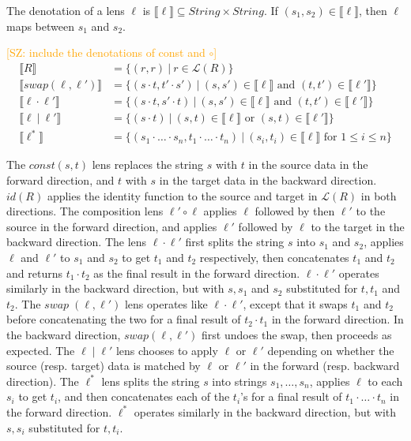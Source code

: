 \documentclass{svproc}
\newcommand{\FINISH}[3]{\ifdraft\textcolor{#1}{[#2: #3]}\fi}
\newcommand{\saz}[1]{\FINISH{orange}{SZ}{#1}}
\newcommand{\sep}{\ensuremath{\ | \ }}
\begin{document}
The denotation of a lens $\ell$ is $\llbracket \ell \rrbracket \subseteq
\mathit{String} \times \mathit{String}$. If $(s_1, s_2) \in \llbracket \ell
\rrbracket$, then $\ell$ maps between $s_1$ and $s_2$.

\saz{include the denotations of const and $\circ$}
\begin{align*}
\llbracket R \rrbracket &= \{(r, r) \sep r \in \mathcal{L}(R)\}\\
\llbracket swap(\ell, \ell') \rrbracket &= \{(s \cdot t, t' \cdot s') \sep
(s, s') \in \llbracket \ell \rrbracket \text{ and } (t, t') \in \llbracket
\ell' \rrbracket\}\\
\llbracket \ell \cdot \ell' \rrbracket &= \{(s \cdot t, s' \cdot t) \sep
(s, s') \in \llbracket \ell \rrbracket \text{ and } (t, t') \in \llbracket
\ell' \rrbracket\}\\
\llbracket \ell \sep \ell' \rrbracket &= \{(s \cdot t) \sep
(s, t) \in \llbracket \ell \rrbracket \text{ or } (s, t) \in \llbracket
\ell' \rrbracket\}\\
\llbracket \ell^* \rrbracket &= \{(s_1 \cdot \ldots \cdot s_n, t_1 \cdot \ldots
\cdot t_n) \sep (s_i, t_i) \in \llbracket \ell \rrbracket \text{ for } 1
\leq i \leq n\}
\end{align*}

The $\mathit{const}(s, t)$ lens replaces the string $s$ with $t$ in the source
data in the forward direction, and $t$ with $s$ in the target data in the backward
direction. $\mathit{id}(R)$ applies the identity function to the source and target
in $\mathcal{L}(R)$ in both directions. The composition lens $\ell' \circ \ell$
applies $\ell$ followed by then $\ell'$ to the source in the forward direction,
and applies $\ell'$ followed by $\ell$ to the target in the backward direction.
The lens $\ell \cdot \ell'$ first splits the string $s$ into $s_1$ and $s_2$,
applies $\ell$ and $\ell'$ to $s_1$ and $s_2$ to get $t_1$ and $t_2$
respectively, then concatenates $t_1$ and $t_2$ and returns $t_1 \cdot t_2$ as
the final result in the forward direction. $\ell \cdot \ell'$ operates
similarly in the backward direction, but with $s, s_1$ and $s_2$ substituted
for $t, t_1$ and $t_2$. The $\mathit{swap} \; (\ell, \ell')$ lens operates
like $\ell \cdot \ell'$, except that it swaps $t_1$ and $t_2$ before
concatenating the two for a final result of $t_2 \cdot t_1$ in the forward
direction. In the backward direction, $\mathit{swap}(\ell, \ell')$ first undoes
the swap, then proceeds as expected. The $\ell \; | \; \ell'$ lens
chooses to apply $\ell$ or $\ell'$ depending on whether the source
(resp. target) data is matched by $\ell$ or $\ell'$ in the forward (resp.
backward direction). The $\ell^*$ lens splits the string $s$ into strings $s_1,
\ldots, s_n$, applies $\ell$ to each $s_i$ to get $t_i$, and then concatenates
each of the $t_i$'s for a final result of $t_1 \cdot \ldots \cdot t_n$ in the
forward direction. $\ell^*$ operates similarly in the backward direction, but
with $s, s_i$ substituted for $t, t_i$.
\end{document}
